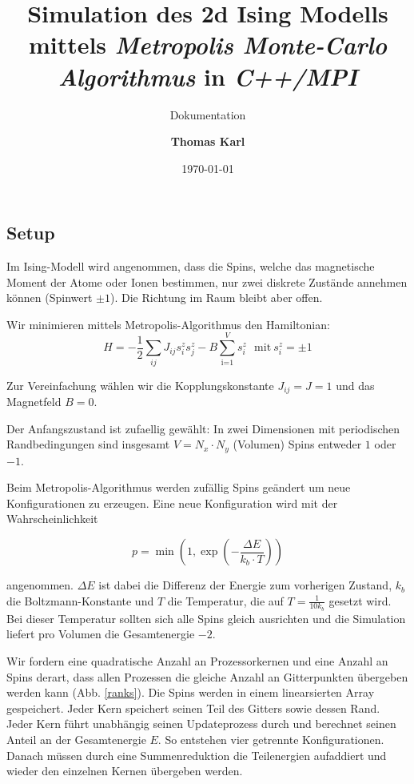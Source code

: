 \documentclass[headsepline=3pt,headinclude=true,14pt]{scrartcl}
\title{Simulation des 2d Ising Modells mittels \textit{Metropolis Monte-Carlo Algorithmus} in \textit{C++/MPI}}
\subtitle{Dokumentation}
\date{\today}
\author{\textbf{Thomas Karl}%
}
\begin{document}
\begin{onehalfspace}
\maketitle

\section{Setup}
Im Ising-Modell wird angenommen, dass die Spins, welche das magnetische Moment der Atome oder Ionen bestimmen, nur zwei diskrete Zustände annehmen können (Spinwert $\pm 1$). Die Richtung im Raum bleibt aber offen.

Wir minimieren mittels Metropolis-Algorithmus den Hamiltonian:
\begin{equation}
H = -\frac{1}{2}\sum_{ij} J_{ij}s^z_is^z_j - B\sum_{\text{i=1}}^Vs_i^{z} ~~~ \text{mit} ~ s_i^z = \pm 1
\end{equation}

Zur Vereinfachung wählen wir die Kopplungskonstante $J_{ij}=J=1$ und das Magnetfeld $B = 0$. 

Der Anfangszustand ist zufaellig gew\"ahlt: In zwei Dimensionen mit periodischen Randbedingungen sind insgesamt $V = N_x\cdot N_y$ (Volumen) Spins entweder $1$ oder $-1$. 

Beim Metropolis-Algorithmus werden zuf\"allig Spins ge\"andert um neue Konfigurationen zu erzeugen. Eine neue Konfiguration wird mit der Wahrscheinlichkeit 

\begin{equation}
p = \min\left( 1, \exp\left(-\frac{\Delta E}{k_b\cdot T}\right) \right)
\end{equation}

angenommen. $\Delta E$ ist dabei die Differenz der Energie zum vorherigen Zustand, $k_b$ die Boltzmann-Konstante und $T$ die Temperatur, die auf $T=\frac{1}{10k_b}$ gesetzt wird. Bei dieser Temperatur sollten sich alle Spins gleich ausrichten und die Simulation liefert pro Volumen die Gesamtenergie $-2$.

Wir fordern eine quadratische Anzahl an Prozessorkernen und eine Anzahl an Spins derart, dass allen Prozessen die gleiche Anzahl an Gitterpunkten übergeben werden kann (Abb. \ref{ranks}). Die Spins werden in einem linearsierten Array gespeichert. Jeder Kern speichert seinen Teil des Gitters sowie dessen Rand. Jeder Kern führt unabhängig seinen Updateprozess durch und berechnet seinen Anteil an der Gesamtenergie $E$. So entstehen vier getrennte Konfigurationen. Danach müssen durch eine Summenreduktion die Teilenergien aufaddiert und wieder den einzelnen Kernen übergeben werden.


\end{onehalfspace}
\end{document}
